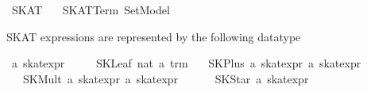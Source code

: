 %
\begin{isabellebody}%
\def\isabellecontext{SKAT}%
%
\isadelimtheory
%
\endisadelimtheory
%
\isatagtheory
{}\isamarkupfalse%
\ SKAT\isanewline
\ \ \ SKAT{}Term\ Set{}Model\isanewline
{}%
\endisatagtheory
{\isafoldtheory}%
%
\isadelimtheory
%
\endisadelimtheory
%
\isamarkuptrue%
%
\isamarkuptrue%
%
\begin{isamarkuptext}%
SKAT expressions are represented by the following datatype%
\end{isamarkuptext}%
\isamarkuptrue%
\isamarkupfalse%
\ {}a\ skat{}expr\ {}\isanewline
\ \ \ \ SKLeaf\ nat\ {}{}a\ trm{}\isanewline
\ \ {}\ SKPlus\ {}{}a\ skat{}expr{}\ {}{}a\ skat{}expr{}\ {}\ {}{}{}{}{}\ {}{}{}\isanewline
\ \ {}\ SKMult\ {}{}a\ skat{}expr{}\ {}{}a\ skat{}expr{}\ {}\ {}{}{}{}{}\ {}{}{}\isanewline
\ \ {}\ SKStar\ {}{}a\ skat{}expr{}\isanewline

\end{isabellebody}

